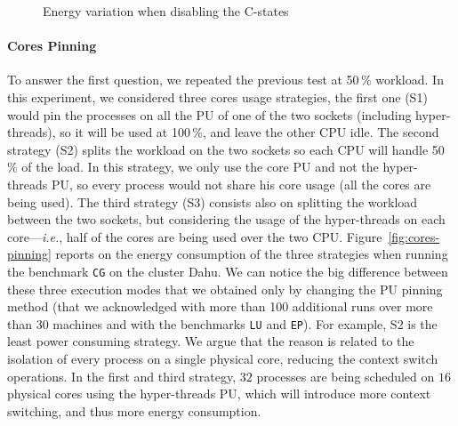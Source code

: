 \begin{figure}
    \caption{Energy variation when disabling the C-states}\label{fig:c-states}
\end{figure}

\paragraph{Cores Pinning}
To answer the first question, we repeated the previous test at 50\,\% workload.
In this experiment, we considered three cores usage strategies, the first one (\textsf{S1}) would pin the processes on all the PU of one of the two sockets (including hyper-threads), so it will be used at 100\,\%, and leave the other CPU idle.
The second strategy (\textsf{S2}) splits the workload on the two sockets so each CPU will handle 50\,\% of the load.
In this strategy, we only use the core PU and not the hyper-threads PU, so every process would not share his core usage (all the cores are being used).
The third strategy (\textsf{S3}) consists also on splitting the workload between the two sockets, but considering the usage of the hyper-threads on each core---\emph{i.e.}, half of the cores are being used over the two CPU.
Figure~\ref{fig:cores-pinning} reports on the energy consumption of the three strategies when running the benchmark \texttt{CG} on the cluster \textsf{Dahu}.
We can notice the big difference between these three execution modes that we obtained only by changing the PU pinning method (that we acknowledged with more than 100 additional runs over more than 30 machines and with the benchmarks \texttt{LU} and \texttt{EP}).
For example, \textsf{S2} is the least power consuming strategy.
We argue that the reason is related to the isolation of every process on a single physical core, reducing the context switch operations.
In the first and third strategy, $32$ processes are being scheduled on $16$ physical cores using the hyper-threads PU, which will introduce more context switching, and thus more energy consumption.

